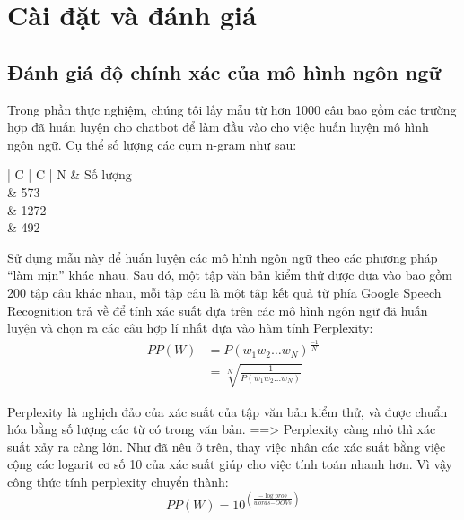 \documentclass[12pt]{report}
\begin{document}
\chapter{Cài đặt và đánh giá} \label{chap:setup}

\section{Đánh giá độ chính xác của mô hình ngôn ngữ}

Trong phần thực nghiệm, chúng tôi lấy mẫu từ hơn 1000 câu bao gồm các trường hợp đã huấn luyện cho chatbot để làm đầu vào cho việc huấn luyện mô hình ngôn ngữ. Cụ thể số lượng các cụm n-gram như sau:
\begin{table}[h]
	\caption{Số lượng các cụm n-gram trong tập huấn luyện}
	\centering
	\begin{tabular}{ | C | C | }
	\hline
	N & Số lượng \\
	 & 573 \\
	 & 1272 \\
	 & 492 \\
	\hline
	\end{tabular}
\end{table}

Sử dụng mẫu này để huấn luyện các mô hình ngôn ngữ theo các phương pháp ``làm mịn'' khác nhau. Sau đó, một tập văn bản kiểm thử được đưa vào bao gồm 200 tập câu khác nhau, mỗi tập câu là một tập kết quả từ phía Google Speech Recognition trả về để tính xác suất dựa trên các mô hình ngôn ngữ đã huấn luyện và chọn ra các câu hợp lí nhất dựa vào hàm tính Perplexity:
\begin{align*}
PP(W) &= P(w_1w_2 \ldots w_N)^{\frac{-1}{N}} \\
	&= \sqrt[N]{\frac{1}{P(w_1w_2 \ldots w_N)}}
\end{align*}

Perplexity là nghịch đảo của xác suất của tập văn bản kiểm thử, và được chuẩn hóa bằng số lượng các từ có trong văn bản.
==> Perplexity càng nhỏ thì xác suất xảy ra càng lớn. Như đã nêu ở trên, thay việc nhân các xác suất bằng việc cộng các logarit cơ số 10 của xác suất giúp cho việc tính toán nhanh hơn. Vì vậy công thức tính perplexity chuyển thành:
\[PP(W) = 10^{(\frac{-\log\textit{prob}}{\textit{words} - \textit{OOVs}})}\]
\end{document}
